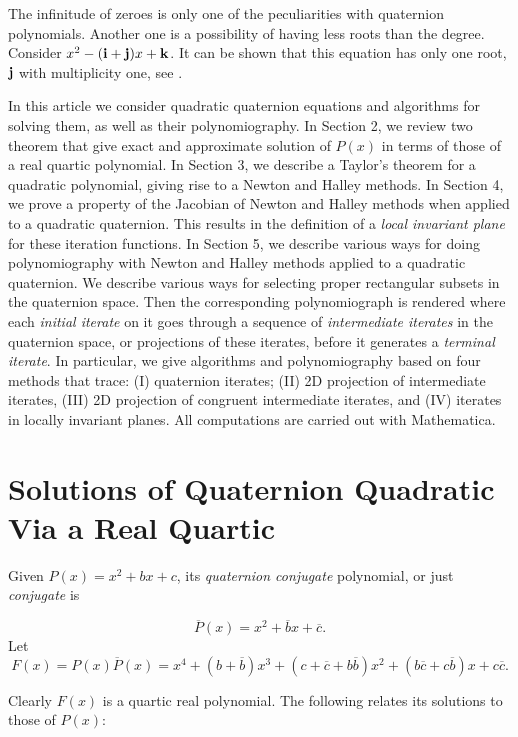 \documentclass{article}
\theoremstyle{definition}
\begin{document}
The infinitude of zeroes is only one of the peculiarities with quaternion polynomials. Another one is a possibility of having less roots than the degree.
Consider $x^2-({\bf i}+{\bf j})x+{\bf k}$. It can be shown that
this equation has only one root, ${\bf j}$ with multiplicity  one,
see \cite{kalQ}.

In this article we consider quadratic quaternion equations and algorithms for solving them, as well as their polynomiography.  In Section 2, we review two theorem that give exact and approximate solution of $P(x)$ in terms of those of a real quartic polynomial. In Section 3, we describe a Taylor's theorem for a quadratic polynomial, giving rise to a Newton and Halley methods. In Section 4, we prove a property of the Jacobian of Newton and Halley methods when applied to a quadratic quaternion. This results in the definition of a {\it local invariant plane} for these iteration functions. In Section 5, we describe various ways for doing polynomiography with Newton and Halley methods applied to a quadratic quaternion. We describe various ways for selecting proper rectangular subsets in the quaternion space. Then the corresponding polynomiograph is rendered where each {\it initial iterate} on it goes through a sequence of {\it intermediate iterates} in the quaternion space, or projections of these iterates, before it generates a {\it terminal iterate}. In particular, we give algorithms and polynomiography based on four methods that trace: (I) quaternion iterates; (II) 2D projection of intermediate iterates, (III) 2D
projection of congruent intermediate iterates, and (IV)  iterates in locally invariant planes. All computations are carried out with Mathematica.


\section{Solutions of Quaternion Quadratic Via a Real Quartic} Given $P(x)=x^2+bx+c$, its {\it quaternion conjugate} polynomial, or just {\it conjugate} is

\begin{equation}
\overline P(x)= x^2+ \overline b x + \overline c.
\end{equation}
Let
\begin{equation}
F(x)=P(x)\overline P(x)= x^4+(b +\overline b)x^3+(c + \overline c + b \overline b)x^2 +(b \overline c + c \overline b)x+c \overline c.
\end{equation}

Clearly $F(x)$ is a quartic real polynomial. The
following relates its solutions to those of $P(x)$:
\end{document}
